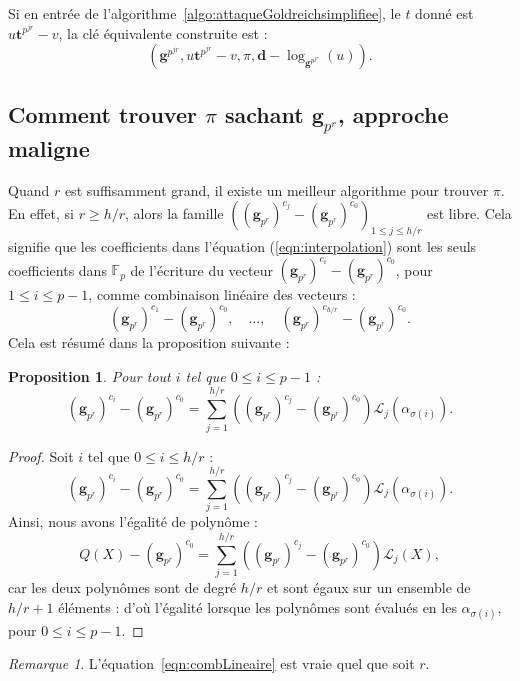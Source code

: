 \documentclass[a4paper, titlepage, 11pt]{article}
\newtheorem{prop}[theo]{Proposition}
\theoremstyle{definition}
\theoremstyle{remark}
\newtheorem{rema}[theo]{Remarque}
\def\gf #1{\mathbb{F}_{#1}}
\def\mbf #1{\mathbf{#1}}
\begin{document}
Si en entrée de l'algorithme~\ref{algo:attaqueGoldreichsimplifiee}, le $t$ donné est $u \mbf t^{p^{jr}} -v$, la clé équivalente construite est : $$(\mbf g^{p^{jr}}, u \mbf t^{p^{jr}} -v, \pi, \mbf d - \log_{\mbf g^{p^{jr}}}(u)).$$

\subsection{Comment trouver $\pi$ sachant $\mbf g_{p^r}$, approche maligne}

Quand $r$ est suffisamment grand, il existe un meilleur algorithme pour trouver $\pi$. En effet, si $r \geqslant h/r$, alors la famille $\left((\mbf g_{p^r})^{c_{j}} - (\mbf g_{p^r})^{c_{0}} \right)_{1\leqslant j \leqslant h/r}$ est libre. 
Cela signifie que les coefficients dans l'équation (\ref{eqn:interpolation}) sont les seuls coefficients dans $\gf{p}$ de l'écriture du vecteur $(\mbf g_{p^r})^{c_{i}} - (\mbf g_{p^r})^{c_{0}}$, pour $1\leqslant i \leqslant p-1$, comme combinaison linéaire des vecteurs : $$(\mbf g_{p^r})^{c_{1}} - (\mbf g_{p^r})^{c_{0}},\quad \dots,\quad (\mbf g_{p^r})^{c_{{h/r}}} - (\mbf g_{p^r})^{c_{0}}.$$
Cela est résumé dans la proposition suivante :

\begin{prop}Pour tout $i$ tel que $0\leqslant i \leqslant p-1$ :
\begin{equation}\label{eqn:combLineaire}
(\mbf g_{p^r})^{c_i} - (\mbf g_{p^r})^{c_{0}} = \sum_{j=1}^{h/r} \left((\mbf g_{p^r})^{c_{j}} - (\mbf g_{p^r})^{c_{0}} \right)\mathcal L_j(\alpha_{\sigma(i)}).
\end{equation}
\end{prop}

\begin{proof}
Soit $i$ tel que $0 \leqslant i \leqslant {h/r}$ :
$$(\mbf g_{p^r})^{c_i} - (\mbf g_{p^r})^{c_{0}} = \sum_{j=1}^{h/r} \left((\mbf g_{p^r})^{c_{j}} - (\mbf g_{p^r})^{c_{0}} \right)\mathcal L_j(\alpha_{\sigma(i)}).$$
Ainsi, nous avons l'égalité de polynôme :
$$Q(X) - (\mbf g_{p^r})^{c_{0}} = \sum_{j=1}^{h/r} \left((\mbf g_{p^r})^{c_{j}} - (\mbf g_{p^r})^{c_{0}} \right)\mathcal L_j(X),$$
car les deux polynômes sont de degré $h/r$ et sont égaux sur un ensemble de $h/r + 1$ éléments : d'où l'égalité lorsque les polynômes sont évalués en les $\alpha_{\sigma(i)}$, pour $0\leqslant i \leqslant p-1$.\end{proof}

\begin{rema}
L'équation~\ref{eqn:combLineaire} est vraie quel que soit $r$.
\end{rema}
\end{document}
